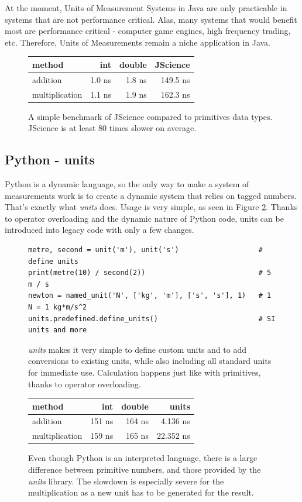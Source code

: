 \documentclass[12pt,oneside,a4paper]{scrbook}
\theoremstyle{definition}
\begin{document}
At the moment, Units of Measurement Systems in Java are only practicable in systems that are not performance critical. Alas, many systems that would benefit most are performance critical - computer game engines, high frequency trading, etc. Therefore, Units of Measurements remain a niche application in Java.

\begin{figure}
\begin{tabular}{lrrr}
method          & int    & double  & JScience \\
\midrule
addition        & 1.0 ns &  1.8 ns    &   149.5 ns \\
multiplication  & 1.1 ns &  1.9 ns    &   162.3 ns
\end{tabular}
\caption{A simple benchmark of JScience compared to primitives data types. JScience is at least 80 times slower on average.}
\label{bench:jscience}
\end{figure}


\subsection{Python - units}

Python is a dynamic language, so the only way to make a system of measurements work is to create a dynamic system that relies on tagged numbers. That's exactly what \emph{units} \citep{Donohue12} does. Usage is very simple, as seen in Figure \ref{code:python_units}. Thanks to operator overloading and the dynamic nature of Python code, units can be introduced into legacy code with only a few changes.

\begin{figure}
\begin{verbatim}
metre, second = unit('m'), unit('s')                   # define units
print(metre(10) / second(2))                           # 5 m / s
newton = named_unit('N', ['kg', 'm'], ['s', 's'], 1)   # 1 N = 1 kg*m/s^2
units.predefined.define_units()                        # SI units and more
\end{verbatim}
\caption{\emph{units} makes it very simple to define custom units and to add conversions to existing units, while also including all standard units for immediate use. Calculation happens just like with primitives, thanks to operator overloading.}
\label{code:python_units}
\end{figure}



\begin{figure}
\begin{tabular}{lrrr}
method          & int    & double  & units \\
\midrule
addition        & 151 ns &  164 ns    &    4.136 ns \\
multiplication  & 159 ns &  165 ns    &   22.352 ns
\end{tabular}
\caption{Even though Python is an interpreted language, there is a large difference between primitive numbers, and those provided by the \emph{units} library. The slowdown is especially severe for the multiplication as a new unit has to be generated for the result.}
\label{bench:python_units}
\end{figure}
\end{document}
